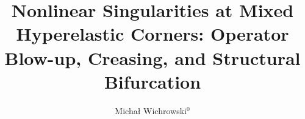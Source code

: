 \usepackage{lipsum}
\usepackage{amsfonts}
\usepackage{graphicx}
\usepackage{epstopdf}
\usepackage{amsmath,amssymb,amsthm}
\usepackage{bm}
\DeclareMathOperator{\tr}{tr}
\providecommand{\Grad}{\nabla}
\newtheorem{lemma}{Lemma}
\newtheorem{theorem}{Theorem}
\newtheorem{proposition}{Proposition}
\newtheorem{corollary}{Corollary}
\theoremstyle{definition}
\newtheorem{assumption}{Assumption}
\theoremstyle{remark}
\newtheorem{remark}{Remark}
\theoremstyle{plain}
\ifpdf
\else
\fi

\newcommand{\creflastconjunction}{, and~}


\title{Nonlinear Singularities at Mixed Hyperelastic Corners: Operator Blow-up, Creasing, and Structural Bifurcation }
\author{Michał Wichrowski$^0$}

\usepackage{amsopn}
\DeclareMathOperator{\diag}{diag}
